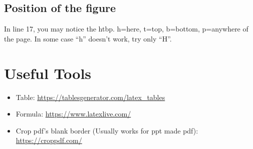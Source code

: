 \subsection{Position of the figure}
In line 17, you may notice the htbp. h=here, t=top, b=bottom, p=anywhere of the page. In some case ``h'' doesn't work, try only ``H''.

\section{Useful Tools}
\begin{itemize}
    \item Table: \url{https://tablesgenerator.com/latex_tables}
    \item Formula:
    \url{https://www.latexlive.com/}
    \item Crop pdf's blank border (Usually works for ppt made pdf): \url{https://croppdf.com/}
\end{itemize}